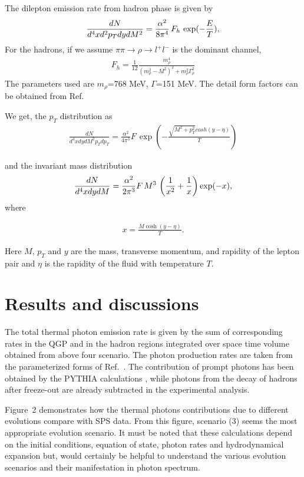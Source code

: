 The dilepton emission rate from hadron phase is given by
\begin{eqnarray}\label{}
\frac{dN}{d^4x d^2p_T dy dM^2} = \frac{\alpha^2}{8\pi^4}\, F_h \,
 \exp(-{E\over T}),
\end{eqnarray}
For the hadrons, if we assume 
$\pi\pi \rightarrow \rho \rightarrow l^+l^-$ is the dominant channel, 
\begin{eqnarray}\label{}
F_h = \frac{1}{12} \frac{m_\rho^4}{(m_\rho^2-M^2)^2 + m_\rho^2 \Gamma_\rho^2}
\end{eqnarray}
The parameters used are $m_\rho$=768 MeV, $\Gamma$=151 MeV. The detail
form factors can be obtained from Ref.~\cite{GALE}

We get, the $p_T$ distribution as
\begin{eqnarray}\label{}
\frac{dN}{d^4x dy dM^2 p_T dp_T } = \frac{\alpha^2}{4\pi^3}  F \,
   \exp\left(-\frac{ \sqrt{M^2 + p_T^2} cosh (y-\eta)}{T}\right)
\end{eqnarray}

and the invariant mass distribution 
\begin{eqnarray}\label{}
\frac{dN}{d^4x dy dM} = \frac{\alpha^2}{2\pi^3} F \, M^3 \,
\left({1\over x^2} + {1\over x}\right) \exp(-x),
\end{eqnarray}
where

\begin{eqnarray}\label{}
x=\frac{ M \cosh (y-\eta)}{T}.
\end{eqnarray}

Here $M$, $p_T$ and $y$ are the mass, transverse momentum,
and  rapidity of the lepton pair and $\eta$ is the rapidity
of the fluid with temperature $T$.

\section{Results and discussions}

  The total thermal photon emission rate is given by the sum of 
corresponding rates in the QGP and in the hadron regions integrated 
over space time volume obtained from above four scenario. The photon 
production rates are taken from the parameterized forms of Ref.~\cite{THOMA}.
 The contribution of prompt photons has been obtained by the PYTHIA
calculations \cite{GALLMEISTER}, while photons from the decay of hadrons
after freeze-out are already subtracted in the experimental analysis.

   Figure~2 demonstrates how the thermal photons contributions due to 
different evolutions compare with SPS data. 
From this figure, scenario (3) seems the most appropriate evolution scenario. 
 It must be noted that these calculations depend on the initial conditions, 
equation of state, photon rates and hydrodynamical expansion but, would 
certainly be helpful to understand the various evolution scenarios and their 
manifestation in photon spectrum.


